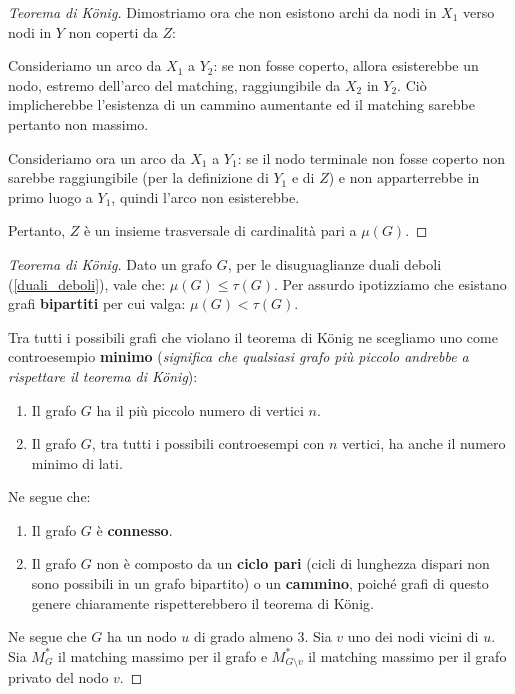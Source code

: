\documentclass[\main/main.tex]{subfiles}
\begin{document}
\begin{proof}[Teorema di König]
	Dimostriamo ora che non esistono archi da nodi in \(X_1\) verso nodi in \(Y\) non coperti da \(Z\):

	Consideriamo un arco da \(X_1\) a \(Y_2\): se non fosse coperto, allora esisterebbe un nodo, estremo dell'arco del matching, raggiungibile da \(X_2\) in \(Y_2\). Ciò implicherebbe l'esistenza di un cammino aumentante ed il matching sarebbe pertanto non massimo.

	Consideriamo ora un arco da \(X_1\) a \(Y_1\): se il nodo terminale non fosse coperto non sarebbe raggiungibile (per la definizione di \(Y_1\) e di \(Z\)) e non apparterrebbe in primo luogo a \(Y_1\), quindi l'arco non esisterebbe.

	Pertanto, \(Z\) è un insieme trasversale di cardinalità pari a \(\mu(G)\).
\end{proof}
\clearpage
\begin{proof}[Teorema di König]
	Dato un grafo \(G\), per le disuguaglianze duali deboli (\ref{duali_deboli}), vale che: \(\mu(G) \leq \tau(G)\). Per assurdo ipotizziamo che esistano grafi \textbf{bipartiti} per cui valga: \(\mu(G) < \tau(G)\).

	Tra tutti i possibili grafi che violano il teorema di König ne scegliamo uno come controesempio \textbf{minimo} (\textit{significa che qualsiasi grafo più piccolo andrebbe a rispettare il teorema di König}):
	\begin{enumerate}
		\item Il grafo \(G\) ha il più piccolo numero di vertici \(n\).
		\item Il grafo \(G\), tra tutti i possibili controesempi con \(n\) vertici, ha anche il numero minimo di lati.
	\end{enumerate}

	Ne segue che:

	\begin{enumerate}
		\item Il grafo \(G\) è \textbf{connesso}.
		\item Il grafo \(G\) non è composto da un \textbf{ciclo pari} (cicli di lunghezza dispari non sono possibili in un grafo bipartito) o un \textbf{cammino}, poiché grafi di questo genere chiaramente rispetterebbero il teorema di König.
	\end{enumerate}

	Ne segue che \(G\) ha un nodo \(u\) di grado almeno \(3\). Sia \(v\) uno dei nodi vicini di \(u\). Sia \(M^*_G\) il matching massimo per il grafo e \(M^*_{G\setminus v}\) il matching massimo per il grafo privato del nodo \(v\).


\end{proof}
\end{document}

